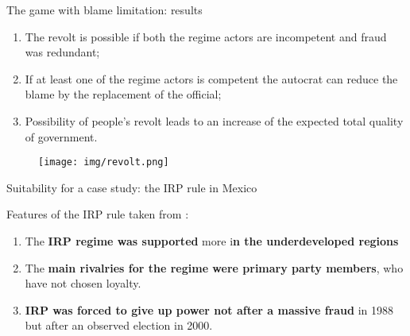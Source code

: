 \documentclass{beamer}
\begin{document}
\begin{frame}{The game with blame limitation: results}
    
    \begin{enumerate}
        
        \item The revolt is possible if both the regime actors are incompetent and fraud was redundant;
        
        \item If at least one of the regime actors is competent the autocrat can reduce the blame by the replacement of the official;
        
        \item Possibility of people's revolt leads to an increase of the expected total quality of government.
        
    \end{enumerate}
    
\end{frame}

\begin{frame}[plain]
    
    \begin{figure}
        \centering
        \texttt{[image: img/revolt.png]}
        \label{fig9}
    \end{figure}
    
\end{frame}

\begin{frame}{\hypertarget{case1}{Suitability for a case study: the IRP rule in Mexico }}

   Features of the IRP rule taken from \parencite{votingforautocracy}:\\
    \begin{enumerate}
        
        \item The \textbf{IRP regime was supported} more i\textbf{n the underdeveloped regions}%
        
        \item The \textbf{main rivalries for the regime were primary party members}, who have not chosen loyalty.%
        
        \item \textbf{IRP was forced to give up power not after a massive fraud} in 1988 but after an observed election in 2000.%
        
    \end{enumerate}
    
\end{frame}
\end{document}
